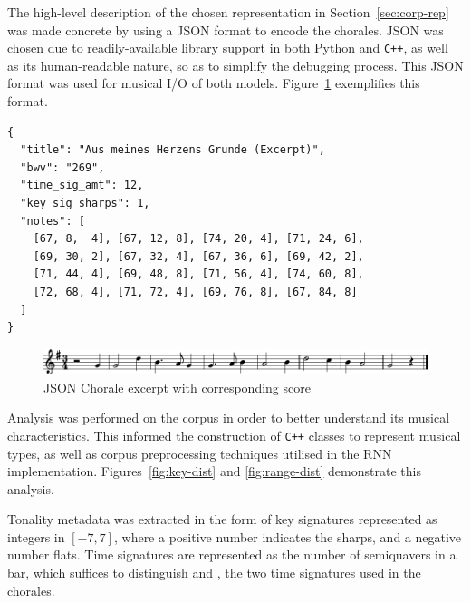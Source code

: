 \documentclass[12pt,a4paper,twoside,openright]{report}
\newcommand{\sref}[1]{Section~\ref{#1}}
\begin{document}
The high-level description of the chosen representation in
\sref{sec:corp-rep} was made concrete by using a JSON format to encode
the chorales. JSON was chosen due to readily-available library support in both
Python and \texttt{C++}, as well as its human-readable nature, so as to simplify
the debugging process. This JSON format was used for musical I/O of both models.
Figure~\ref{fig:chorale-excerpt} exemplifies this format. 

\vspace{4mm}
\begin{verbatim}
{
  "title": "Aus meines Herzens Grunde (Excerpt)",
  "bwv": "269",
  "time_sig_amt": 12,
  "key_sig_sharps": 1,
  "notes": [
    [67, 8,  4], [67, 12, 8], [74, 20, 4], [71, 24, 6], 
    [69, 30, 2], [67, 32, 4], [67, 36, 6], [69, 42, 2], 
    [71, 44, 4], [69, 48, 8], [71, 56, 4], [74, 60, 8], 
    [72, 68, 4], [71, 72, 4], [69, 76, 8], [67, 84, 8]
  ]
}
\end{verbatim}

\begin{figure}[H]
\centering
\includegraphics[width=450pt]{figs/aus_meines_excerpt.pdf}
\caption{JSON Chorale excerpt with corresponding score}
\label{fig:chorale-excerpt}
\end{figure}

Analysis was performed on the corpus in order to better understand its musical
characteristics. This informed the construction of \texttt{C++} classes to
represent musical types, as well as corpus preprocessing techniques utilised in
the RNN implementation. Figures~\ref{fig:key-dist} and \ref{fig:range-dist}
demonstrate this analysis.

Tonality metadata was extracted in the form of key signatures represented as
integers in $[-7,7]$, where a positive number indicates the sharps, and a
negative number flats. Time signatures are represented as the number of
semiquavers in a bar, which suffices to distinguish  and
, the two time signatures used in the chorales.
\end{document}
